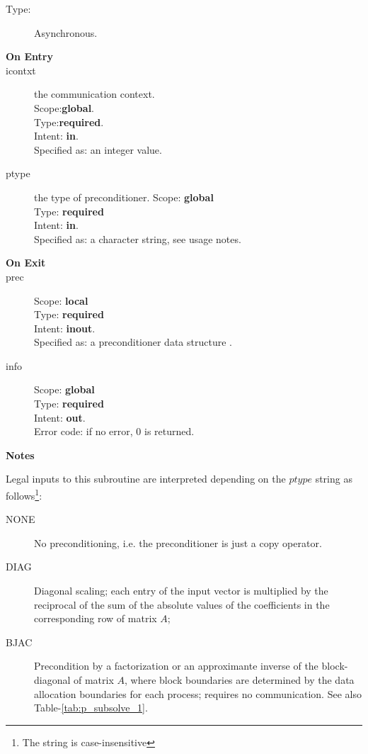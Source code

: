 \begin{description}
\item[Type:] Asynchronous.
\item[\bf On Entry]
\item[icontxt] the communication context.\\
Scope:{\bf global}.\\
Type:{\bf required}.\\
Intent: {\bf in}.\\
Specified as: an integer value.
\item[ptype] the type of preconditioner. 
Scope: {\bf global} \\
Type: {\bf required}\\
Intent: {\bf in}.\\
Specified as: a character string, see usage notes.
\item[\bf On Exit]

\item[prec] 
Scope: {\bf local} \\
Type: {\bf required}\\
Intent: {\bf inout}.\\
Specified as: a preconditioner data structure \precdata.
\item[info] 
Scope: {\bf global} \\
Type: {\bf required}\\
Intent: {\bf out}.\\
Error code: if no error, 0 is returned.
\end{description}
{\par\noindent\large\bfseries Notes}
Legal inputs to this subroutine are interpreted depending on the
$ptype$ string as follows\footnote{The string is case-insensitive}:
\begin{description}
\item[NONE] No preconditioning, i.e. the preconditioner is just a copy
  operator.
\item[DIAG] Diagonal scaling; each entry of the input vector is
  multiplied by the reciprocal of the sum of the absolute values of
  the coefficients in the corresponding row of matrix  $A$;
\item[BJAC] Precondition by a factorization or an approximante inverse
  of the   block-diagonal of matrix $A$, where block boundaries are
  determined   by the data allocation boundaries for each process;
  requires no   communication.  See also Table-\ref{tab:p_subsolve_1}. 
\end{description}
